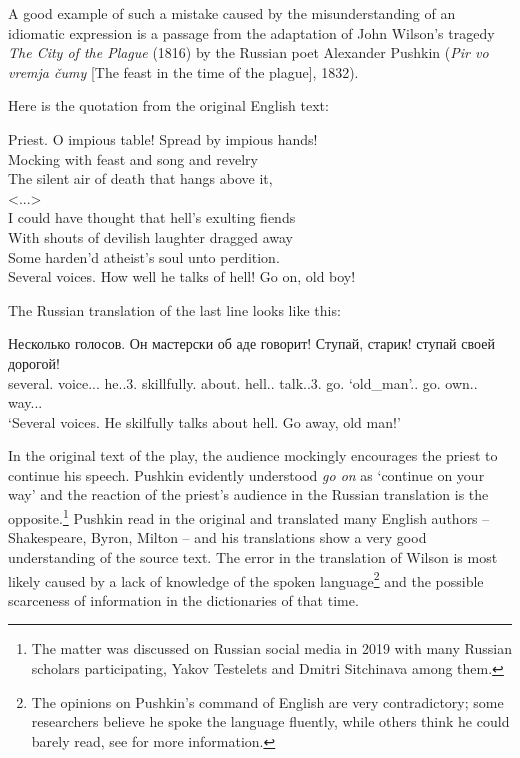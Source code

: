 \documentclass[output=paper]{langscibook}
\begin{document}
A good example of such a mistake caused by the misunderstanding of an idiomatic expression is a passage from the adaptation of John Wilson’s tragedy \textit{The City of the Plague} (1816) by the Russian poet Alexander Pushkin (\textit{Pir vo vremja čumy} [The feast in the time of the plague], 1832).

Here is the quotation from the original English text:

\ea
Priest. O impious table! Spread by impious hands!\\
 Mocking with feast and song and revelry\\
 The silent air of death that hangs above it,\\
 <...>\\
 I could have thought that hell’s exulting fiends\\
 With shouts of devilish laughter dragged away\\
 Some harden’d atheist’s soul unto perdition.\\
 Several voices. How well he talks of hell! Go on, old boy!
 \z

The Russian translation of the last line looks like this:

\ea
\gll Несколько голосов. Он мастерски об аде говорит! Ступай, старик! ступай своей дорогой!\\
     several.{\PRON} voice.{\NOUN}.{\GEN}.{\PL} he.{\PRON}.3.{\NOM} skillfully.{\ADV} about.{\PREP} hell.{\NOUN}.{\LOC} talk.{\PRES}.3{\SG}. go.{\IMP} `old\_man'.{\NOUN}.{\NOM} go.{\IMP} own.{\PRON}.{\INSTR} way.{\NOUN}.{\INSTR}.{\SG}\\
\glt `Several voices. He skilfully talks about hell. Go away, old man!'

\z

In the original text of the play, the audience mockingly encourages the priest to continue his speech. Pushkin evidently understood \textit{go on} as ‘continue on your way’ and the reaction of the priest’s audience in the Russian translation is the opposite.\footnote{The matter was discussed on Russian social media in 2019 with many Russian scholars participating, Yakov Testelets and Dmitri Sitchinava among them.} Pushkin read in the original and translated many English authors – Shakespeare, Byron, Milton – and his translations show a very good understanding of the source text. The error in the translation of Wilson is most likely caused by a lack of knowledge of the spoken language\footnote{The opinions on Pushkin’s command of English are very contradictory; some researchers believe he spoke the language fluently, while others think he could barely read, see \citealt{Zaharov2008} for more information.} and the possible scarceness of information in the dictionaries of that time.
\end{document}

